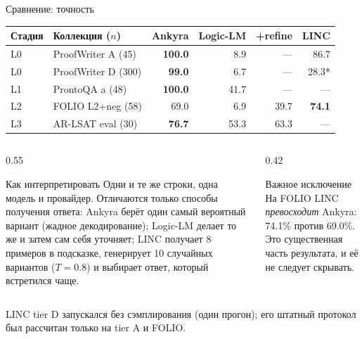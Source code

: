 \documentclass[aspectratio=169,11pt]{beamer}
\newcommand{\Prov}[1]{\textcolor{provencolor}{#1}}
\begin{document}
\begin{frame}[shrink=5]{Сравнение: точность}
  \centering
  \footnotesize
  \begin{tabular}{@{}llrrrr@{}}
    \toprule
    \textbf{Стадия} & \textbf{Коллекция (\(n\))} & \textbf{Ankyra} &
    \textbf{Logic-LM} & \textbf{+refine} & \textbf{LINC} \\
    \midrule
    L0 & ProofWriter A (45) & \Prov{\textbf{100.0}} & 8.9 & --- & 86.7 \\
    L0 & ProofWriter D (300) & \Prov{\textbf{99.0}} & 6.7 & --- & 28.3* \\
    L1 & ProntoQA a (48) & \Prov{\textbf{100.0}} & 41.7 & --- & --- \\
    L2 & FOLIO L2+neg (58) & 69.0 & 6.9 & 39.7 & \Prov{\textbf{74.1}} \\
    L3 & AR-LSAT eval (30) & \Prov{\textbf{76.7}} & 53.3 & 63.3 & --- \\
    \bottomrule
  \end{tabular}

  \vspace{2mm}
  \begin{columns}[T,onlytextwidth]
    \begin{column}{0.55\textwidth}
      \begin{block}{Как интерпретировать}
        Одни и те же строки, одна модель и провайдер. Отличаются только
        способы получения ответа: Ankyra берёт один самый вероятный вариант
        (жадное декодирование); Logic-LM делает то же и затем сам себя
        уточняет; LINC получает 8 примеров в подсказке, генерирует 10
        случайных вариантов (\(T=0.8\)) и выбирает ответ, который встретился
        чаще.
      \end{block}
    \end{column}
    \begin{column}{0.42\textwidth}
      \begin{block}{Важное исключение}
        На FOLIO LINC \emph{превосходит} Ankyra: 74.1\% против 69.0\%.
        Это существенная часть результата, и её не следует скрывать.
      \end{block}
    \end{column}
  \end{columns}

  \vspace{1mm}
  {\scriptsize * LINC tier D запускался без сэмплирования (один прогон);
  его штатный протокол был рассчитан только на tier A и FOLIO.}
\end{frame}
\end{document}
